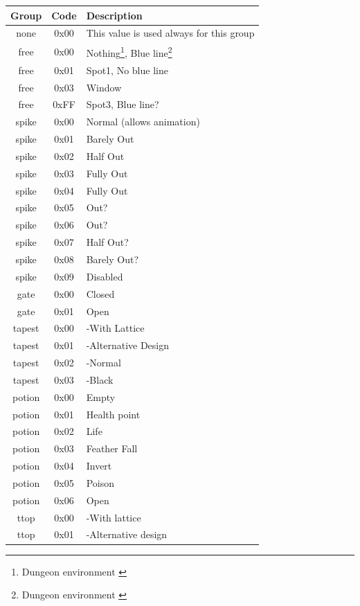 \documentclass{article}
\begin{document}
\begin{table}
\begin{tabular}{ccl}
\hline
 Group & Code & Description \\
\hline
 none  & 0x00 & This value is used always for this group \\
 free  & 0x00 & Nothing\footnote[1]{Dungeon environment \label{id:de}}, Blue line\footnote[2]{Dungeon environment \label{id:pe}} \\
 free  & 0x01 & Spot1\footnotemark[1], No blue line\footnotemark[2] \\
 free  & 0x03 & Window \\
 free  & 0xFF & Spot3\footnotemark[1], Blue line?\footnotemark[2] \\
 spike & 0x00 & Normal (allows animation) \\
 spike & 0x01 & Barely Out \\
 spike & 0x02 & Half Out \\
 spike & 0x03 & Fully Out \\
 spike & 0x04 & Fully Out \\
 spike & 0x05 & Out? \\
 spike & 0x06 & Out? \\
 spike & 0x07 & Half Out? \\
 spike & 0x08 & Barely Out? \\
 spike & 0x09 & Disabled \\
 gate  & 0x00 & Closed \\
 gate  & 0x01 & Open \\
 tapest & 0x00 & -With Lattice \\
 tapest & 0x01 & -Alternative Design \\
 tapest & 0x02 & -Normal \\
 tapest & 0x03 & -Black \\
 potion & 0x00 & Empty \\
 potion & 0x01 & Health point \\
 potion & 0x02 & Life \\
 potion & 0x03 & Feather Fall \\
 potion & 0x04 & Invert \\
 potion & 0x05 & Poison \\
 potion & 0x06 & Open \\
 ttop  & 0x00 & -With lattice \\
 ttop  & 0x01 & -Alternative design \\

\end{tabular}
\end{table}
\end{document}
